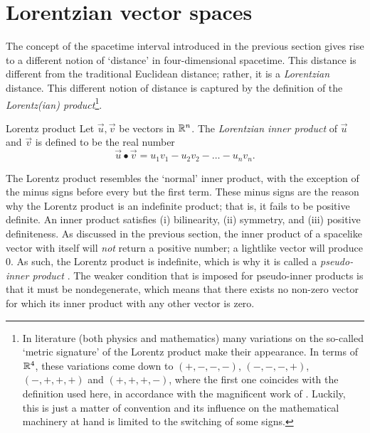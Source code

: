 \section{Lorentzian vector spaces}
\label{sec:lorentz_metric}
The concept of the spacetime interval introduced in the previous section gives rise to a different notion of `distance' in four-dimensional spacetime. This distance is different from the traditional Euclidean distance; rather, it is a \emph{Lorentzian} distance. This different notion of distance is captured by the definition of the \emph{Lorentz(ian) product}\footnote{In literature (both physics and mathematics) many variations on the so-called `metric signature' of the Lorentz product make their appearance. In terms of \(\mathbb{R}^4\), these variations come down to \((+,-,-,-)\), \((-,-,-,+)\), \((-,+,+,+)\) and \((+,+,+,-)\), where the first one coincides with the definition used here, in accordance with the magnificent work of \citet{Landau1971}. Luckily, this is just a matter of convention and its influence on the mathematical machinery at hand is limited to the switching of some signs.}.

\begin{thmblock}{Lorentz product}
    Let \(\vec{u}, \vec{v}\) be vectors in \(\mathbb{R}^n\). The \emph{Lorentzian inner product} of \(\vec{u}\) and \(\vec{v}\) is defined to be the real number
    \begin{equation}
        \vec{u} \bullet \vec{v} = u_1v_1 - u_2v_2 - \ldots - u_nv_n.
        \label{eq:lorentz_product}
    \end{equation}
\end{thmblock}
The Lorentz product resembles the `normal'  inner product, with the exception of the minus signs before every but the first term. These minus signs are the reason why the Lorentz product is an indefinite product; that is, it fails to be positive definite. An inner product satisfies (i) bilinearity, (ii) symmetry, and (iii) positive definiteness. As discussed in the previous section, the inner product of a spacelike vector with itself will \emph{not} return a positive number;  a lightlike vector will produce 0. As such, the Lorentz product is indefinite, which is why it is called a \emph{pseudo-inner product} \cite{Ratcliffe2019,Schuller2014}. The weaker condition that is imposed for pseudo-inner products is that it must be nondegenerate, which means that there exists no non-zero vector for which its inner product with any other vector is zero.

